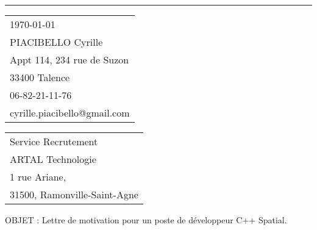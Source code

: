 \documentclass{article}
\begin{document}


\vspace{-1em} %

\rule{\linewidth}{1pt} %

\bigskip\bigskip %


\hfill
\begin{tabular}{l @{}}
	\today \bigskip\\ %
	PIACIBELLO Cyrille \\
	Appt 114, 234 rue de Suzon \\ %
	33400 Talence \\
	06-82-21-11-76 \\
	cyrille.piacibello@gmail.com
\end{tabular}

\bigskip %


\begin{tabular}{@{} l}
  Service Recrutement \\
  ARTAL Technologie \\
  1 rue Ariane,\\
  31500, Ramonville-Saint-Agne
\end{tabular}

\bigskip %

OBJET : Lettre de motivation pour un poste de développeur C++ Spatial.


\bigskip %

\end{document}
